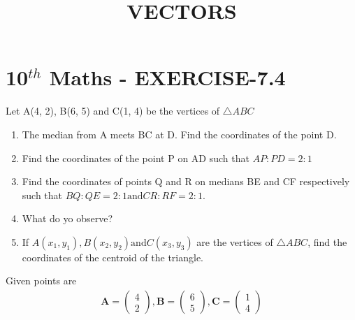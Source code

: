 \documentclass[12pt]{article}
\newcommand{\myvec}[1]{\ensuremath{\begin{pmatrix}#1\end{pmatrix}}}
\let\vec\mathbf
\begin{document}
\begin{center}
\title{\textbf{VECTORS}}
\date{\vspace{-5ex}} %
\maketitle
\end{center}

\section{10$^{th}$ Maths - EXERCISE-7.4}

Let A(4, 2), B(6, 5) and C(1, 4) be the vertices of $\triangle ABC$
\begin{enumerate}
\item The median from A meets BC at D. Find the coordinates of the point D.
\item Find the coordinates of the point P on AD such that $AP : PD = 2 : 1$
\item Find the coordinates of points Q and R on medians BE and CF respectively such
that $BQ : QE = 2 : 1 \text{and} CR : RF = 2 : 1.$
\item What do yo observe?
\item If $A(x_1, y_1), B(x_2, y_2) \text{and} C(x_3, y_3)$ are the vertices of $\triangle ABC$, find the coordinates of the centroid of the triangle.
\end{enumerate}

Given points are
\begin{align}
\vec{A}=\myvec{4\\ 2} ,
\vec{B}=\myvec{6\\ 5} ,
\vec{C}=\myvec{1\\ 4}
\end{align}
\fi
\end{document}
